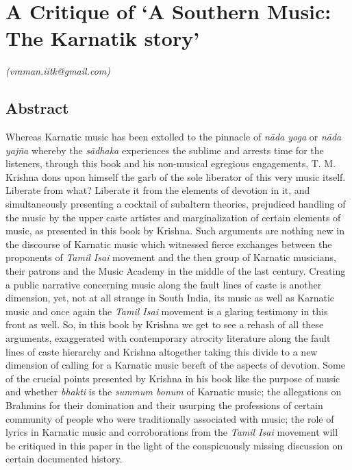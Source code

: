 
\chapter{A Critique of ‘A Southern Music: The Karnatik story’}\label{chapter6}


\vspace{-.3cm}

\begin{flushright}
\textit{(vraman.iitk@gmail.com)}
\end{flushright}

\vspace{-.5cm}

\section*{Abstract}

Whereas Karnatic music has been extolled to the pinnacle of \textit{nāda yoga} or \textit{nāda yajña} whereby the \textit{sādhaka} experiences the sublime and arrests time for the listeners, through this book and his non-musical egregious engagements, T. M. Krishna dons upon himself the garb of the sole liberator of this very music itself. Liberate from what? Liberate it from the elements of devotion in it, and simultaneously presenting a cocktail of subaltern theories, prejudiced handling of the music by the upper caste artistes and marginalization of certain elements of music, as presented in this book by Krishna. Such arguments are nothing new in the discourse of Karnatic music which witnessed fierce exchanges between the proponents of \textit{Tamil Isai} movement and the then group of Karnatic musicians, their patrons and the Music Academy in the middle of the last century. Creating a public narrative concerning music along the fault lines of caste is another dimension, yet, not at all strange in South India, its music as well as Karnatic music and once again the \textit{Tamil Isai} movement is a glaring testimony in this front as well. So, in this book by Krishna we get to see a rehash of all these arguments, exaggerated with contemporary atrocity literature along the fault lines of caste hierarchy and Krishna altogether taking this divide to a new dimension of calling for a Karnatic music bereft of the aspects of devotion. Some of the crucial points presented by Krishna in his book like the purpose of music and whether \textit{bhakti} is the \textit{summum bonum} of Karnatic music; the allegations on Brahmins for their domination and their usurping the professions of certain community of people who were traditionally associated with music; the role of lyrics in Karnatic music and corroborations from the \textit{Tamil Isai} movement will be critiqued in this paper in the light of the conspicuously missing discussion on certain documented history.

